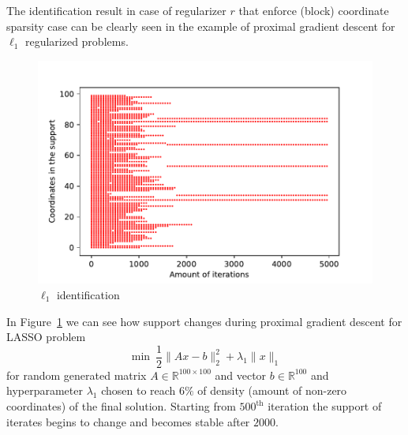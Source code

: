 The identification result in case of regularizer $r$ that enforce (block) coordinate sparsity case can be clearly seen in the example of proximal gradient descent for $\ell_1$ regularized problems.


\begin{figure}[H]
\centering

\includegraphics{basics_2/l1_supp.pdf}
\caption{$\ell_1$ identification}
\label{fig:l1supp}
\end{figure}

% 

In Figure~\ref{fig:l1supp} we can see how support changes during proximal gradient descent for LASSO problem 
$$
\min~\frac12\|Ax-b\|_2^2 + \lambda_1\|x\|_1
$$
for random generated matrix $A\in\mathbb{R}^{100\times100}$ and vector $b\in\mathbb{R}^{100}$ and hyperparameter $\lambda_1$ chosen to reach $6\%$ of density (amount of non-zero coordinates) of the final solution.
Starting from $500^{\text{th}}$ iteration the support of iterates begins to change and becomes stable after $2000$.



